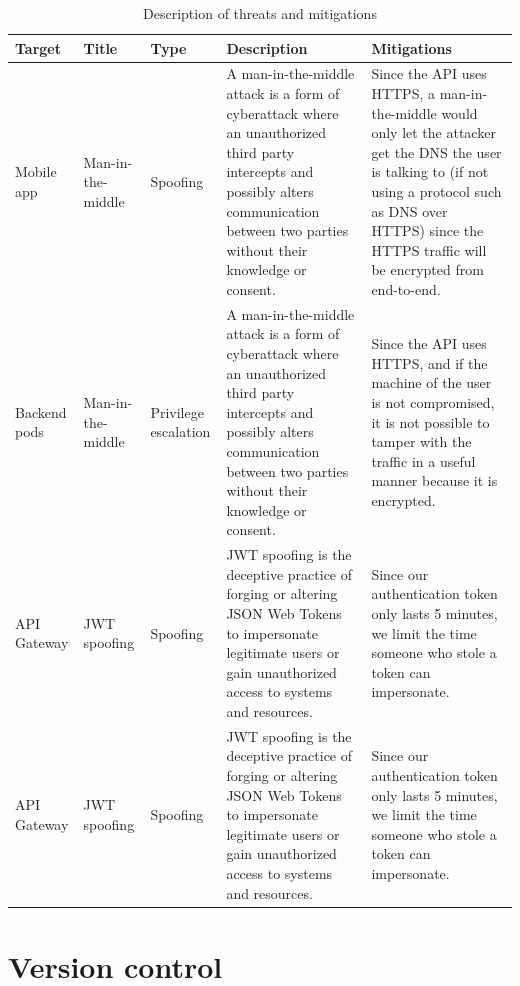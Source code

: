 \documentclass[12pt,x11names]{article}
\begin{document}
\begin{table}[htbp] %
  \centering
  \small %
  \begin{tabular}{|p{2.5cm}|p{2.5cm}|p{2.5cm}|p{4cm}|p{4cm}|}
  \hline
  \textbf{Target} & \textbf{Title} & \textbf{Type} & \textbf{Description} & \textbf{Mitigations} \\ 
  \hline
  Mobile app & Man-in-the-middle & Spoofing & A man-in-the-middle attack is a form of cyberattack where an unauthorized third party intercepts and possibly alters communication between two parties without their knowledge or consent. & Since the API uses HTTPS, a man-in-the-middle would only let the attacker get the DNS the user is talking to (if not using a protocol such as DNS over HTTPS) since the HTTPS traffic will be encrypted from end-to-end. \\ 
  \hline
  Backend pods & Man-in-the-middle & Privilege escalation & A man-in-the-middle attack is a form of cyberattack where an unauthorized third party intercepts and possibly alters communication between two parties without their knowledge or consent. & Since the API uses HTTPS, and if the machine of the user is not compromised, it is not possible to tamper with the traffic in a useful manner because it is encrypted. \\ 
  \hline
  API Gateway & JWT spoofing & Spoofing & JWT spoofing is the deceptive practice of forging or altering JSON Web Tokens to impersonate legitimate users or gain unauthorized access to systems and resources. & Since our authentication token only lasts 5 minutes, we limit the time someone who stole a token can impersonate. \\ 
  \hline
  API Gateway & JWT spoofing & Spoofing & JWT spoofing is the deceptive practice of forging or altering JSON Web Tokens to impersonate legitimate users or gain unauthorized access to systems and resources. & Since our authentication token only lasts 5 minutes, we limit the time someone who stole a token can impersonate. \\ 
  \hline
  \end{tabular}
  \caption{Description of threats and mitigations}
\end{table}

\bigskip

\section{Version control}
\end{document}
